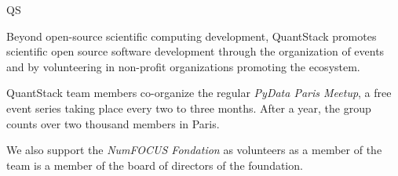 \begin{sitedescription}{QS}
\par Beyond open-source scientific computing development, QuantStack promotes scientific open source software development through the organization of events and by volunteering in non-profit organizations promoting the ecosystem.

\begin{compactenum}

\item QuantStack team members co-organize the regular \emph{PyData Paris Meetup}, a free event series taking place every two to three months. After a year, the group counts over two thousand members in Paris.

\item We also support the \emph{NumFOCUS Fondation} as volunteers as a member of the team is a member of the board of directors of the foundation.

\end{compactenum}


\end{sitedescription}

